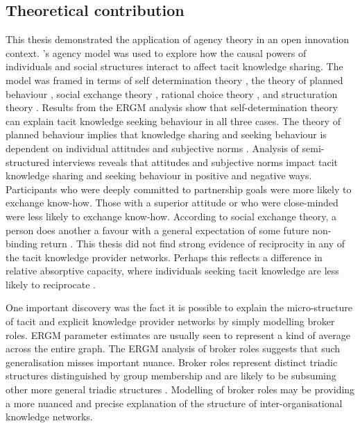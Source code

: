 \subsection{Theoretical contribution}

This thesis demonstrated the application of agency theory in an open innovation context. \citeauthor{loyal2001agency}'s \citeyearpar{loyal2001agency} agency model was used to explore how the causal powers of individuals and social structures interact to affect tacit knowledge sharing. The model was framed in terms of self determination theory \citep{deci1985conceptualizations}, the theory of planned behaviour \citep{ajzen1985intentions}, social exchange theory \citep{homans1961social,blau1964exchange}, rational choice theory \citep{parsons1937structure,coleman1990foundations}, and structuration theory \citep{giddens1984constitution}. Results from the ERGM analysis show that self-determination theory can explain tacit knowledge seeking behaviour in all three cases. The theory of planned behaviour implies that knowledge sharing and seeking behaviour is dependent on individual attitudes and subjective norms \citep{gagne2009model}. Analysis of semi-structured interviews reveals that attitudes and subjective norms impact tacit knowledge sharing and seeking behaviour in positive and negative ways. Participants who were deeply committed to partnership goals were more likely to exchange know-how. Those with a superior attitude or who were close-minded were less likely to exchange know-how. According to social exchange theory, a person does another a favour with a general expectation of some future non-binding return \citep{homans1961social}. This thesis did not find strong evidence of reciprocity in any of the tacit knowledge provider networks. Perhaps this reflects a difference in relative absorptive capacity, where individuals seeking tacit knowledge are less likely to reciprocate \citep{lane1998relative}. \medskip

One important discovery was the fact it is possible to explain the micro-structure of tacit and explicit knowledge provider networks by simply modelling broker roles. ERGM parameter estimates are usually seen to represent a kind of average across the entire graph. The ERGM analysis of broker roles suggests that such generalisation misses important nuance. Broker roles represent distinct triadic structures distinguished by group membership and are likely to be subsuming other more general triadic structures \citep{gould1989structures}. Modelling of broker roles may be providing a more nuanced and precise explanation of the structure of inter-organisational knowledge networks. 

